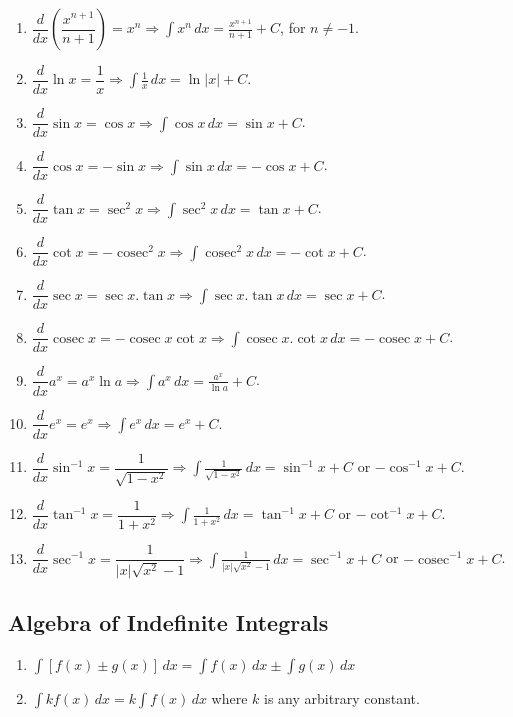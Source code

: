 \documentclass{book}
\DeclareMathOperator{\cosec}{cosec}
\theoremstyle{definition}
\begin{document}
\begin{enumerate}
    \item $\dfrac{d}{dx}\left(\dfrac{x^{n+1}}{n+1}\right)=x^n \Longrightarrow  \displaystyle\int x^n \, dx=\frac{x^{n+1}}{n+1}+C$, for $n\neq -1$.    
    \item $\dfrac{d}{dx}\ln x=\dfrac{1}{x} \Longrightarrow \displaystyle\int \frac{1}{x} \, dx=\ln |x|+C$.
    \item $\dfrac{d}{dx}\sin x=\cos x \Longrightarrow \displaystyle\int \cos x \, dx=\sin x+C$.
    \item $\dfrac{d}{dx}\cos x=-\sin x \Longrightarrow \displaystyle\int \sin x \, dx=-\cos x+C$.
    \item $\dfrac{d}{dx}\tan x=\sec^2 x \Longrightarrow \displaystyle\int \sec^2 x \, dx=\tan x+C$.
    \item $\dfrac{d}{dx}\cot x=-\cosec^2 x \Longrightarrow \displaystyle\int \cosec^2 x \, dx=-\cot x+C$.
    \item $\dfrac{d}{dx}\sec x=\sec x.\tan x \Longrightarrow \displaystyle\int \sec x.\tan x \, dx=\sec x+C$.
    \item $\dfrac{d}{dx}\cosec x=-\cosec x\cot x \Longrightarrow \displaystyle\int \cosec x.\cot x \, dx=-\cosec x+C$.
    \item $\dfrac{d}{dx}a^x=a^x\ln a\Longrightarrow \displaystyle\int a^x \, dx=\frac{a^x}{\ln a}+C$.
    \item $\dfrac{d}{dx}e^x=e^x\Longrightarrow \displaystyle\int e^x \, dx=e^x+C$.
    \item $\dfrac{d}{dx}\sin^{-1}x=\dfrac{1}{\sqrt{1-x^2}}\Longrightarrow \displaystyle\int \frac{1}{\sqrt{1-x^2}} \, dx=\sin^{-1}x+C$ or $-\cos^{-1}x+C$.
    \item $\dfrac{d}{dx}\tan^{-1}x=\dfrac{1}{1+x^2}\Longrightarrow \displaystyle\int \frac{1}{1+x^2} \, dx=\tan^{-1}x+C$  or $-\cot^{-1}x+C$.
    \item $\dfrac{d}{dx}\sec^{-1}x=\dfrac{1}{|x|\sqrt{x^2}-1}\Longrightarrow \displaystyle\int \frac{1}{|x|\sqrt{x^2}-1} \, dx=\sec^{-1}x+C$ or $-\cosec^{-1}x+C$.
\end{enumerate}

\subsection{Algebra of Indefinite Integrals}

\begin{enumerate}[label=(\roman*)]
    \item $\displaystyle\int [f(x)\pm g(x)] \, dx=\int f(x) \, dx\pm \int g(x) \, dx$ 
    \item $\displaystyle\int kf(x) \, dx=k\int f(x)\, dx$ where $k$ is any arbitrary constant.
\end{enumerate}
\end{document}
